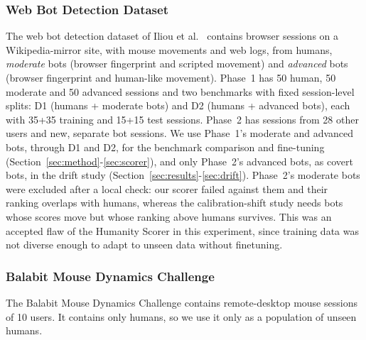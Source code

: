 \documentclass{ieeetj}
\begin{document}
\vspace{-15pt}
\subsubsection{Web Bot Detection Dataset}
The web bot detection dataset of Iliou et al.\ \cite{iliou_2021} contains browser sessions on a Wikipedia-mirror site, with mouse movements and web logs, from humans, \emph{moderate} bots (browser fingerprint and scripted movement) and \emph{advanced} bots (browser fingerprint and human-like movement). Phase~1 has 50 human, 50 moderate and 50 advanced sessions and two benchmarks with fixed session-level splits: D1 (humans + moderate bots) and D2 (humans + advanced bots), each with 35+35 training and 15+15 test sessions. Phase~2 has sessions from 28 other users and new, separate bot sessions. We use Phase~1's moderate and advanced bots, through D1 and D2, for the benchmark comparison and fine-tuning (Section~\ref{sec:method}-\ref{sec:scorer}), and only Phase~2's advanced bots, as covert bots, in the drift study (Section~\ref{sec:results}-\ref{sec:drift}). Phase~2's moderate bots were excluded after a local check: our scorer failed against them and their ranking overlaps with humans, whereas the calibration-shift study needs bots whose scores move but whose ranking above humans survives. This was an accepted flaw of the Humanity Scorer in this experiment, since training data was not diverse enough to adapt to unseen data without finetuning.

\vspace{-15pt}
\subsubsection{Balabit Mouse Dynamics Challenge}
The Balabit Mouse Dynamics Challenge \cite{balabit_2016} contains remote-desktop mouse sessions of 10 users. It contains only humans, so we use it only as a population of unseen humans.

\vspace{-15pt}
\end{document}
